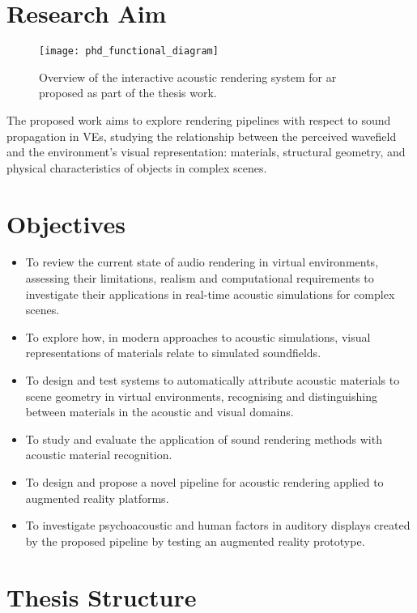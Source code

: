 \section{Research Aim}
\begin{figure}[htbp]
    \centering
    \texttt{[image: phd\_functional\_diagram]}
    \caption[Proposed pipeline schematic overview]{Overview of the interactive acoustic rendering system for \acrshort{ar} proposed as part of the thesis work.}
    \label{fig:proposed-system-diagram}
\end{figure}
The proposed work aims to explore rendering pipelines with respect to sound propagation in VEs, studying the relationship between the perceived wavefield and the environment’s visual representation: materials, structural geometry, and physical characteristics of objects in complex scenes.


\section{Objectives}\label{sec:thesis-objectives}
\begin{itemize}
    \item To review the current state of audio rendering in virtual environments, assessing their limitations, realism and computational requirements to investigate their applications in real-time acoustic simulations for complex scenes.
    \item To explore how, in modern approaches to acoustic simulations, visual representations of materials relate to simulated soundfields.
    \item To design and test systems to automatically attribute acoustic materials to scene geometry in virtual environments, recognising and distinguishing between materials in the acoustic and visual domains.
    \item To study and evaluate the application of sound rendering methods with acoustic material recognition.
    \item To design and propose a novel pipeline for acoustic rendering applied to augmented reality platforms.
    \item To investigate psychoacoustic and human factors in auditory displays created by the proposed pipeline by testing an augmented reality prototype.
\end{itemize}

\section{Thesis Structure}

